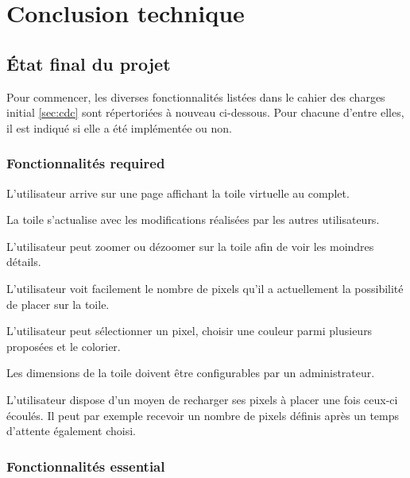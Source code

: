 \section{Conclusion technique}

\subsection{État final du projet}


Pour commencer, les diverses fonctionnalités listées dans le cahier des charges initial \ref{sec:cdc} sont répertoriées à nouveau ci-dessous. Pour chacune d'entre elles, il est indiqué si elle a été implémentée ou non.

\subsubsection{Fonctionnalités \guillemotleft required\guillemotright}

\begin{todolist}
  \item[\done] L'utilisateur arrive sur une page affichant la toile virtuelle au complet.
  \item[\done] La toile s'actualise avec les modifications réalisées par les autres utilisateurs.
  \item[\done] L'utilisateur peut zoomer ou dézoomer sur la toile afin de voir les moindres détails.
  \item[\done] L'utilisateur voit facilement le nombre de pixels qu'il a actuellement la possibilité de placer sur la toile.
  \item[\done] L'utilisateur peut sélectionner un pixel, choisir une couleur parmi plusieurs proposées et le colorier.
  \item[\done] Les dimensions de la toile doivent être configurables par un administrateur.
  \item[\done] L'utilisateur dispose d'un moyen de recharger ses pixels à placer une fois ceux-ci écoulés. Il peut par exemple recevoir un nombre de pixels définis après un temps d'attente également choisi.
\end{todolist}

\subsubsection{Fonctionnalités \guillemotleft essential\guillemotright}

